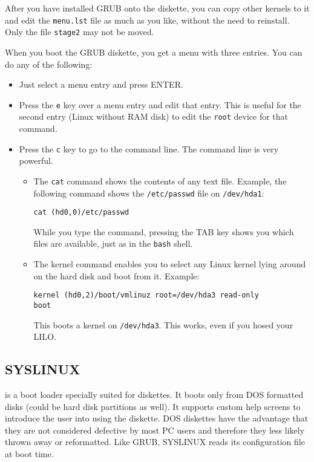 \documentclass[12pt,a4paper]{article}
\begin{document}
After you have installed GRUB onto the diskette, you can copy other
kernels to it and edit the {\tt menu.lst} file as much as you like,
without the need to reinstall. Only the file {\tt stage2} may not be
moved.

When you boot the GRUB diskette, you get a menu with three
entries. You can do any of the following:
\begin{itemize}
\item Just select a menu entry and press ENTER.
\item Press the {\tt e} key over a menu entry and edit that
  entry. This is useful for the second entry (Linux without
  RAM disk) to edit the {\tt root} device for that command. 
\item Press the {\tt c} key to go to the command line. The command
  line is very powerful. 
  \begin{itemize}
  \item The {\tt cat} command shows the contents of any text
  file. Example, the following command shows the {\tt /etc/passwd}
  file on {\tt /dev/hda1}:
\begin{verbatim}
cat (hd0,0)/etc/passwd
\end{verbatim}
  While you type the command, pressing the TAB key shows you which
  files are available, just as in the {\tt bash} shell.
  \item The kernel command enables you to select any Linux kernel
  lying around on the hard disk and boot from it. Example:
\begin{verbatim}
kernel (hd0,2)/boot/vmlinuz root=/dev/hda3 read-only
boot
\end{verbatim}
  This boots a kernel on {\tt /dev/hda3}. This works, even if you hosed
  your LILO.
  \end{itemize}
\end{itemize}


\subsection{SYSLINUX}
 
 is a
boot loader specially suited for diskettes. It boots only from DOS
formatted disks (could be hard disk partitions as well). It supports
custom help screens to introduce the user into using the diskette.
DOS diskettes have the advantage that they are not considered
defective by most PC users and therefore they less likely thrown away
or reformatted. Like GRUB, SYSLINUX reads its configuration file at
boot time.
\end{document}
